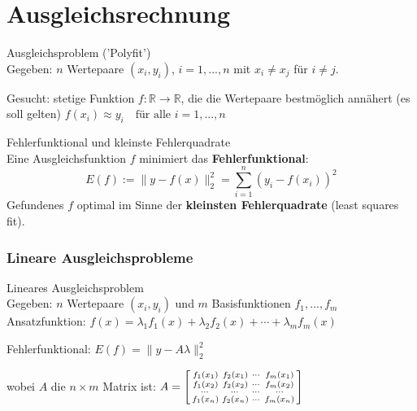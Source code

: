 \section{Ausgleichsrechnung}


\begin{definition}{Ausgleichsproblem} ('Polyfit')\\
Gegeben: $n$ Wertepaare $(x_i, y_i)$, $i = 1, ..., n$ mit $x_i \neq x_j$ für $i \neq j$.

Gesucht: stetige Funktion $f: \mathbb{R} \rightarrow \mathbb{R}$, die die Wertepaare bestmöglich annähert (es soll gelten)
$f(x_i) \approx y_i \quad \text{für alle } i = 1, ..., n$
\end{definition}

\begin{concept}{Fehlerfunktional und kleinste Fehlerquadrate}\\
Eine Ausgleichsfunktion $f$ minimiert das \textbf{Fehlerfunktional}:
\vspace{-3mm}\\
$$E(f) := \|y - f(x)\|_2^2 = \sum_{i=1}^{n} (y_i - f(x_i))^2$$
\small
Gefundenes $f$ optimal im Sinne der \textbf{kleinsten Fehlerquadrate} (least squares fit).
\end{concept}

\subsubsection{Lineare Ausgleichsprobleme}

\begin{definition}{Lineares Ausgleichsproblem} \\
Gegeben: $n$ Wertepaare $(x_i, y_i)$ und $m$ Basisfunktionen $f_1, ..., f_m$
\vspace{1mm}\\
Ansatzfunktion:
$f(x) = \lambda_1 f_1(x) + \lambda_2 f_2(x) + \cdots + \lambda_m f_m(x)$

Fehlerfunktional:
$E(f) = \|y - A\lambda\|_2^2$

wobei $A$ die $n \times m$ Matrix ist:
$A = \begin{bsmallmatrix}
f_1(x_1) & f_2(x_1) & \cdots & f_m(x_1) \\
f_1(x_2) & f_2(x_2) & \cdots & f_m(x_2) \\
\cdots  & \cdots & \cdots & \cdots \\
f_1(x_n) & f_2(x_n) & \cdots & f_m(x_n)
\end{bsmallmatrix}$
\end{definition}

